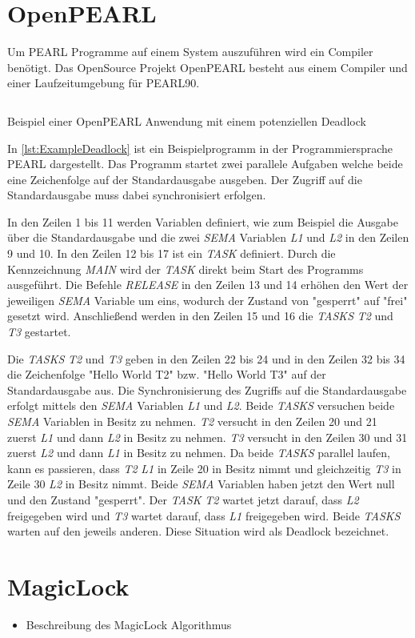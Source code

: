 \section{OpenPEARL}
\label{section:OpenPEARL}
Um PEARL Programme auf einem System auszuführen wird ein Compiler benötigt.
Das OpenSource Projekt OpenPEARL besteht aus einem Compiler und einer Laufzeitumgebung für PEARL90.

\begin{listing}[ht]
  \inputminted[frame=lines,linenos]{vim}{./Examples/Example_Deadlock.prl}
  \caption{Beispiel einer OpenPEARL Anwendung mit einem potenziellen Deadlock}    
  \label{lst:ExampleDeadlock}   
\end{listing} 

In \cref{lst:ExampleDeadlock} ist ein Beispielprogramm in der Programmiersprache
PEARL dargestellt. Das Programm startet zwei parallele Aufgaben welche beide eine Zeichenfolge auf der Standardausgabe ausgeben. Der Zugriff auf die Standardausgabe muss dabei synchronisiert erfolgen.

In den Zeilen 1 bis 11 werden Variablen definiert, wie zum Beispiel die Ausgabe über die Standardausgabe und die zwei \textit{SEMA} Variablen \textit{L1} und \textit{L2} in den Zeilen 9 und 10. In den Zeilen 12 bis 17 ist ein \textit{TASK} definiert. Durch die Kennzeichnung \textit{MAIN} wird der \textit{TASK} direkt beim Start des Programms ausgeführt. Die Befehle \textit{RELEASE} in den Zeilen 13 und 14 erhöhen den Wert der jeweiligen \textit{SEMA} Variable um eins, wodurch der Zustand von "gesperrt" auf "frei" gesetzt wird. Anschließend werden in den Zeilen 15 und 16 die \textit{TASKS} \textit{T2} und \textit{T3} gestartet.

Die \textit{TASKS} \textit{T2} und \textit{T3} geben in den Zeilen 22 bis 24 und in den Zeilen 32 bis 34 die Zeichenfolge "Hello World T2" bzw. "Hello World T3" auf der Standardausgabe aus. Die Synchronisierung des Zugriffs auf die Standardausgabe erfolgt mittels den \textit{SEMA} Variablen \textit{L1} und \textit{L2}. Beide \textit{TASKS} versuchen beide \textit{SEMA} Variablen in Besitz zu nehmen. \textit{T2} versucht in den Zeilen 20 und 21 zuerst \textit{L1} und dann \textit{L2} in Besitz zu nehmen. \textit{T3} versucht in den Zeilen 30 und 31 zuerst \textit{L2} und dann \textit{L1} in Besitz zu nehmen. Da beide \textit{TASKS} parallel laufen, kann es passieren, dass \textit{T2} \textit{L1} in Zeile 20 in Besitz nimmt und gleichzeitig \textit{T3} in Zeile 30 \textit{L2} in Besitz nimmt. Beide \textit{SEMA} Variablen haben jetzt den Wert null und den Zustand "gesperrt". Der \textit{TASK} \textit{T2} wartet jetzt darauf, dass \textit{L2} freigegeben wird und \textit{T3} wartet darauf, dass \textit{L1} freigegeben wird. Beide \textit{TASKS} warten auf den jeweils anderen. Diese Situation wird als Deadlock bezeichnet.

\section{MagicLock}
\label{section:MagicLock}
\begin{itemize}
  \item Beschreibung des MagicLock \autocite{MagicLock} Algorithmus
\end{itemize}